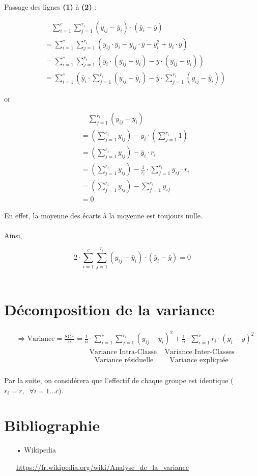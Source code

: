 \documentclass[a4paper,12pt]{article}
\begin{document}
Passage des lignes \textbf{(1)} à \textbf{(2)} :

\begin{align*}
& \quad \sum_{i=1}^{c} \sum_{j=1}^{r_i} (y_{ij}-\bar{y}_i) \cdot (\bar{y}_i-\bar{y}) \\
& = \sum_{i=1}^{c} \sum_{j=1}^{r_i} (y_{ij} \cdot \bar{y}_i - y_{ij} \cdot \bar{y} - \bar{y}_i^2 + \bar{y}_i \cdot \bar{y}) \\
& = \sum_{i=1}^{c} \sum_{j=1}^{r_i} (\bar{y}_i \cdot (y_{ij}-\bar{y}_i)-\bar{y} \cdot (y_{ij}-\bar{y}_i)) \\
& = \sum_{i=1}^{c} (\bar{y}_i \cdot \sum_{j=1}^{r_i} (y_{ij}-\bar{y}_i)-\bar{y} \cdot \sum_{j=1}^{r_i} (y_{ij}-\bar{y}_i))
\end{align*}

or

\begin{align*}
& \quad \sum_{j=1}^{r_i} (y_{ij}-\bar{y}_i) \\
& = (\sum_{j=1}^{r_i} y_{ij}) - \bar{y}_i \cdot (\sum_{j=1}^{r_i} 1) \\
& = (\sum_{j=1}^{r_i} y_{ij}) - \bar{y}_i \cdot r_i \\
& = (\sum_{j=1}^{r_i} y_{ij}) - \frac{1}{r_i} \cdot \sum_{f=1}^{r_i} y_{if} \cdot r_i \\
& = (\sum_{j=1}^{r_i} y_{ij}) - \sum_{f=1}^{r_i} y_{if} \\
& = 0
\end{align*}

En effet, la moyenne des écarts à la moyenne est toujours nulle. \\\\
Ainsi,

\[ 2 \cdot \sum_{i=1}^{c} \sum_{j=1}^{r_i} (y_{ij}-\bar{y}_i) \cdot (\bar{y}_i-\bar{y}) = 0 \]
\\

\section{Décomposition de la variance}

\begin{align*}
& \Rightarrow \text{Variance} = \frac{\text{SCE}}{n} = \frac{1}{n} \cdot \sum_{i=1}^{c} \sum_{j=1}^{r_i}  (y_{ij}-\bar{y}_i)^2 + \frac{1}{n} \cdot \sum_{i=1}^{c} r_i \cdot (\bar{y}_i-\bar{y})^2 \\
& \qquad \qquad \qquad \qquad \qquad \; \text{Variance Intra-Classe} \;\;\;\; \text{Variance Inter-Classes} \\
& \qquad \qquad \qquad \qquad \qquad \quad \text{Variance résiduelle} \qquad \; \text{Variance expliquée}
\end{align*}
\\
Par la suite, on considérera que l'effectif de chaque groupe est identique ($ r_i = r, \;\; \forall i=1...c $).

\section{Bibliographie}

\begin{itemize}
\item[•] Wikipedia
\item[] \url{https://fr.wikipedia.org/wiki/Analyse\_de\_la\_variance}
\end{itemize}
\end{document}

